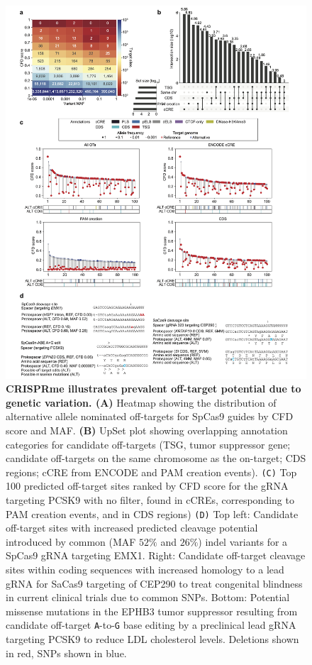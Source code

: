 \documentclass[a4paper, titlepage, openright]{book}
\begin{document}
\begin{figure}
	\centering
	\includegraphics[width=\textwidth]{figures/crisprme8.png}
	\caption[CRISPRme illustrates prevalent off-target potential due to genetic variation]{\textbf{CRISPRme illustrates prevalent off-target potential due to genetic variation. (A)} Heatmap showing the distribution of alternative allele nominated off-targets for SpCas9 guides by CFD score and MAF. \textbf{(B)} UpSet plot showing overlapping annotation categories for candidate off-targets (TSG, tumor suppressor gene; candidate off-targets on the same chromosome as the on-target; CDS regions; cCRE from ENCODE and PAM creation events). \texttt{(C)} Top 100 predicted off-target sites ranked by CFD score for the gRNA targeting PCSK9 with no filter, found in cCREs, corresponding to PAM creation events, and in CDS regions) \texttt{(D)} Top left: Candidate off-target sites with increased predicted cleavage potential introduced by common (MAF $52\%$ and $26\%$) indel variants for a SpCas9 gRNA targeting EMX1. Right: Candidate off-target cleavage sites within coding sequences with increased homology to a lead gRNA for SaCas9 targeting of CEP290 to treat congenital blindness in current clinical trials due to common SNPs. Bottom: Potential missense mutations in the EPHB3 tumor suppressor resulting from candidate off-target \texttt{A}-to-\texttt{G} base editing by a preclinical lead gRNA targeting PCSK9 to reduce LDL cholesterol levels. Deletions shown in red, SNPs shown in blue.}
	\label{fig:crisprme8}
\end{figure} 
\end{document}
